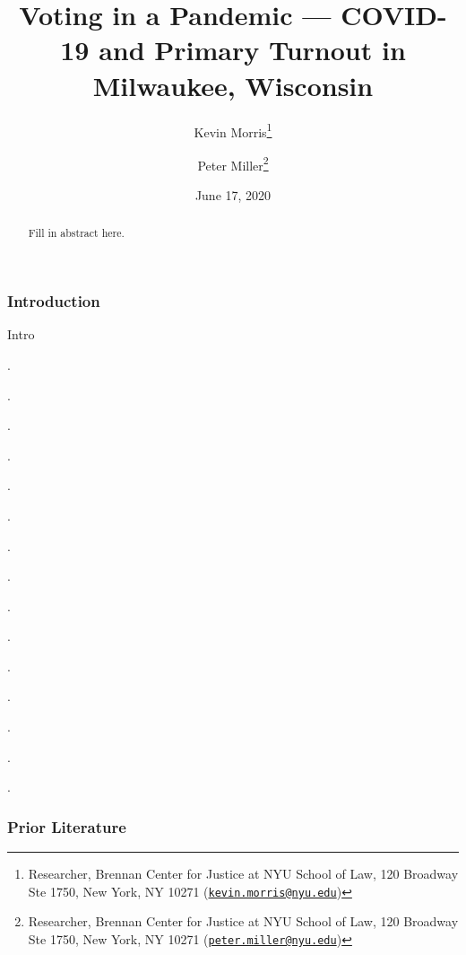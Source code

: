 \documentclass[
  12pt,
]{article}
\title{Voting in a Pandemic --- COVID-19 and Primary Turnout in Milwaukee, Wisconsin}
\author{Kevin Morris\footnote{Researcher, Brennan Center for Justice at NYU School of Law, 120 Broadway Ste 1750, New York, NY 10271 (\href{mailto:kevin.morris@nyu.edu}{\nolinkurl{kevin.morris@nyu.edu}})} \and Peter Miller\footnote{Researcher, Brennan Center for Justice at NYU School of Law, 120 Broadway Ste 1750, New York, NY 10271 (\href{mailto:peter.miller@nyu.edu}{\nolinkurl{peter.miller@nyu.edu}})}}
\date{June 17, 2020}
\begin{document}
\maketitle
\begin{abstract}
Fill in abstract here.
\end{abstract}

\pagebreak

\doublespacing

\hypertarget{introduction}{%
\subsubsection*{Introduction}\label{introduction}}

Intro

.

.

.

.

.

.

.

.

.

.

.

.

.

.

.

\hypertarget{prior-literature}{%
\subsubsection*{Prior Literature}\label{prior-literature}}
\end{document}
